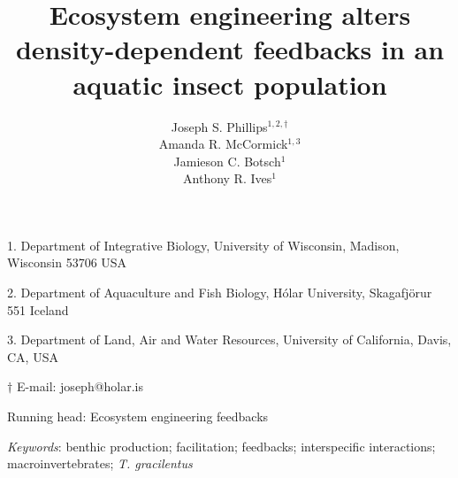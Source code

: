 \documentclass[12pt]{article}
\title{Ecosystem engineering alters density-dependent feedbacks in an aquatic insect population}
\author{
Joseph S. Phillips$^{1,2,\dagger}$ \\
Amanda R. McCormick$^{1,3}$ \\
Jamieson C. Botsch$^{1}$ \\
Anthony R. Ives$^{1}$}
\date{}
\begin{document}
\raggedright
\setlength\parindent{0.25in}

\maketitle

\noindent{} 1. Department of Integrative Biology, University of Wisconsin, Madison, Wisconsin 53706 USA

\noindent{} 2. Department of Aquaculture and Fish Biology, H\'{o}lar University, Skagafj\"{o}r{\dh}ur 551 Iceland

\noindent{} 3. Department of Land, Air and Water Resources, 
University of California, Davis, CA, USA

\noindent{} $\dagger$ E-mail: joseph@holar.is

\bigskip

Running head: {Ecosystem engineering feedbacks}

\linenumbers{}

\clearpage








\bigskip

\textit{Keywords}: {benthic production; 
                    facilitation; 
                    feedbacks; 
                    interspecific interactions; 
                    macroinvertebrates;
                    \emph{T. gracilentus}}

\clearpage







\end{document}
